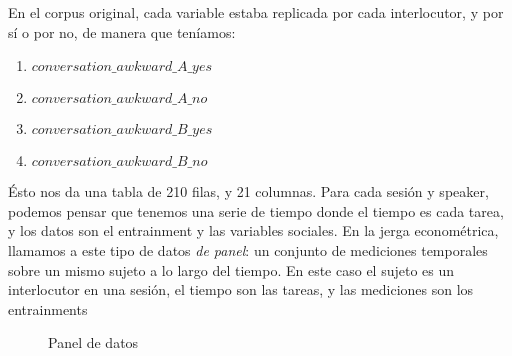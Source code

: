 En el corpus original, cada variable estaba replicada por cada interlocutor, y por sí o por no, de manera que teníamos:

\begin{enumerate}
  \item $conversation\_awkward\_A\_yes$
  \item $conversation\_awkward\_A\_no$
  \item $conversation\_awkward\_B\_yes$
  \item $conversation\_awkward\_B\_no$
\end{enumerate}


Ésto nos da una tabla de 210 filas, y 21 columnas. Para cada sesión y speaker, podemos pensar que tenemos una serie de tiempo donde el tiempo es cada tarea, y los datos son el entrainment y las variables sociales. En la jerga econométrica, llamamos a este tipo de datos \emph{de panel}\cite{gujarati1999}: un conjunto de mediciones temporales sobre un mismo sujeto a lo largo del tiempo. En este caso el sujeto es un interlocutor en una sesión, el tiempo son las tareas, y las mediciones son los entrainments


\begin{figure}
\centering

\caption{Panel de datos}
\label{panel_data}
\end{figure}
